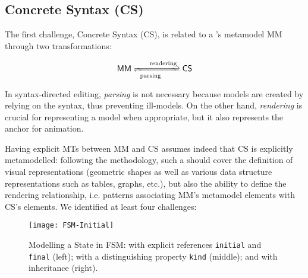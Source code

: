 \subsection{Concrete Syntax (CS)}
\label{sec:CS}

The first challenge, Concrete Syntax (CS), is related to a \DSML's metamodel 
\textsf{MM} through two transformations:

$$ \mathsf{MM} \xrightleftharpoons[\mathrm{parsing}\phantom{MM}]{\phantom{MM}\mathrm{rendering}} \mathsf{CS}$$

In syntax-directed editing, \emph{parsing} is not necessary because models
are created by relying on the syntax, thus preventing ill-models. On the other hand,
\emph{rendering} is crucial for representing a model when appropriate, but
it also represents the anchor for animation. 


Having explicit MTs between \textsf{MM} and \textsf{CS} assumes indeed that 
\textsf{CS} is explicitly metamodelled: following the \MDE methodology, such
a \DSL should cover the definition of visual representations (geometric shapes as
well as various data structure representations such as tables, graphs, etc.),
but also the ability to define the rendering relationship, i.e. patterns associating
\textsf{MM}'s metamodel elements with \textsf{CS}'s elements.
We identified at least four challenges:

\begin{figure}[t]%
   \centering
   \texttt{[image: FSM-Initial]}%
   \caption{Modelling a \textsf{State} in \textsf{FSM}: with explicit references
   \texttt{initial} and \texttt{final} (left); with a distinguishing property 
   \texttt{kind} (middle); and with inheritance (right).}%
   \label{fig:FSM-Initial}%
\end{figure}

